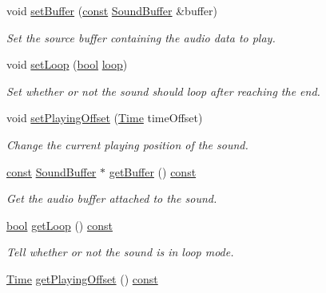 \begin{DoxyCompactItemize}
void \hyperlink{classsf_1_1_sound_a8b395e9713d0efa48a18628c8ec1972e}{set\-Buffer} (\hyperlink{term__entry_8h_a57bd63ce7f9a353488880e3de6692d5a}{const} \hyperlink{classsf_1_1_sound_buffer}{Sound\-Buffer} \&buffer)
\begin{DoxyCompactList}\small\item\em Set the source buffer containing the audio data to play. \end{DoxyCompactList}\item 
void \hyperlink{classsf_1_1_sound_af23ab4f78f975bbabac031102321612b}{set\-Loop} (\hyperlink{term__entry_8h_a002004ba5d663f149f6c38064926abac}{bool} \hyperlink{_lapin_8cpp_ae75dc9a105e970734a903222f40b464c}{loop})
\begin{DoxyCompactList}\small\item\em Set whether or not the sound should loop after reaching the end. \end{DoxyCompactList}\item 
void \hyperlink{classsf_1_1_sound_ab905677846558042022dd6ab15cddff0}{set\-Playing\-Offset} (\hyperlink{classsf_1_1_time}{Time} time\-Offset)
\begin{DoxyCompactList}\small\item\em Change the current playing position of the sound. \end{DoxyCompactList}\item 
\hyperlink{term__entry_8h_a57bd63ce7f9a353488880e3de6692d5a}{const} \hyperlink{classsf_1_1_sound_buffer}{Sound\-Buffer} $\ast$ \hyperlink{classsf_1_1_sound_a5f2f1ec6603f73625f393f0e9ab64476}{get\-Buffer} () \hyperlink{term__entry_8h_a57bd63ce7f9a353488880e3de6692d5a}{const} 
\begin{DoxyCompactList}\small\item\em Get the audio buffer attached to the sound. \end{DoxyCompactList}\item 
\hyperlink{term__entry_8h_a002004ba5d663f149f6c38064926abac}{bool} \hyperlink{classsf_1_1_sound_a603fbd32b519ae1680c40d8ddfc7ea51}{get\-Loop} () \hyperlink{term__entry_8h_a57bd63ce7f9a353488880e3de6692d5a}{const} 
\begin{DoxyCompactList}\small\item\em Tell whether or not the sound is in loop mode. \end{DoxyCompactList}\item 
\hyperlink{classsf_1_1_time}{Time} \hyperlink{classsf_1_1_sound_aeca741a3442d9934369a986ad40f19c0}{get\-Playing\-Offset} () \hyperlink{term__entry_8h_a57bd63ce7f9a353488880e3de6692d5a}{const} 

\end{DoxyCompactItemize}
